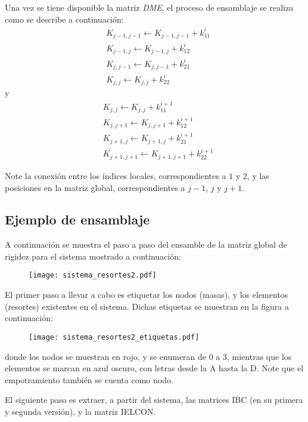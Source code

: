 Una vez se tiene disponible la matriz \emph{DME}, el proceso de ensamblaje se 
realiza como se describe a continuación:
\begin{align*}
&K_{j - 1,j - 1} \leftarrow K_{j - 1,j - 1} + k_{11}^i\\
&K_{j - 1,j} \leftarrow K_{j - 1,j} + k_{12}^i\\
&K_{j,j - 1} \leftarrow K_{j,j - 1} + k_{21}^i\\
&K_{j,j} \leftarrow K_{j,j} + k_{22}^i
\end{align*}
y
\begin{align*}
&K_{j,j} \leftarrow K_{j,j} + k_{11}^{i + 1}\\
&K_{j,j + 1} \leftarrow K_{j,j + 1} + k_{12}^{i + 1}\\
&K_{j + 1,j} \leftarrow K_{j + 1,j} + k_{21}^{i + 1}\\
&K_{j + 1,j + 1} \leftarrow K_{j + 1,j + 1} + k_{22}^{i + 1}
\end{align*}


Note la conexión entre los índices locales, correspondientes a $1$ y $2$, y las 
posiciones en la matriz global, correspondientes a $j-1$, $j$ y $j+1$.


\subsection{Ejemplo de ensamblaje}
A continuación se muestra el paso a paso del ensamble de la matriz global de 
rigidez para el sistema mostrado a continuación:
\begin{figure}[H]
    \centering
    \texttt{[image: sistema\_resortes2.pdf]}
\end{figure}

El primer paso a llevar a cabo es etiquetar los nodos (masas), y los elementos 
(resortes) existentes en el sistema. Dichas etiquetas se muestran en la figura 
a continuación:
\begin{figure}[H]
    \centering
    \texttt{[image: sistema\_resortes2\_etiquetas.pdf]}
\end{figure}
donde los nodos se muestran en rojo, y se enumeran de 0 a 3, mientras que los 
elementos se marcan en azul oscuro, con letras desde la A hasta la D. Note que 
el empotramiento también se cuenta como nodo.

El siguiente paso es extraer, a partir del sistema, las matrices IBC (en su 
primera y segunda versión), y la matriz IELCON.

